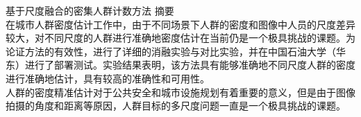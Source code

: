 \documentclass{article}
\begin{document}
	基于尺度融合的密集人群计数方法
摘要\\
在城市人群密度估计工作中，由于不同场景下人群的密度和图像中人员的尺度差异较大，对不同尺度的人群进行准确地密度估计在当前仍是一个极具挑战的课题。为论证方法的有效性，进行了详细的消融实验与对比实验，并在中国石油大学（华东）进行了部署测试。实验结果表明，该方法具有能够准确地不同尺度人群的密度进行准确地估计，具有较高的准确性和可用性。\\
人群的密度精准估计对于公共安全和城市设施规划有着重要的意义，但是由于图像拍摄的角度和距离等原因，人群目标的多尺度问题一直是一个极具挑战的课题。
\end{document}
